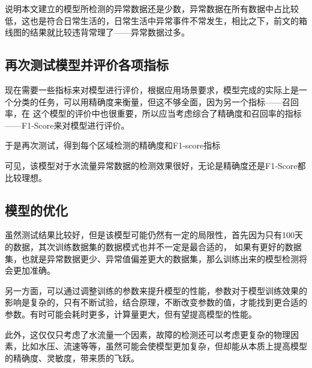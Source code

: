 \documentclass[UTF8]{article}
\begin{document}
			说明本文建立的模型所检测的异常数据还是少数，异常数据在所有数据中占比较低，这也是符合日常生活的，日常生活中异常事件不常发生，相比之下，前文的箱线图的结果就比较违背常理了——异常数据过多。
			\subsection{再次测试模型并评价各项指标}
				\par 现在需要一些指标来对模型进行评价，根据应用场景要求，模型完成的实际上是一个分类的任务，可以用精确度来衡量，但这不够全面，因为另一个指标——召回率，在
				这个模型的评价中也很重要，所以应当考虑综合了精确度和召回率的指标——F1-Score来对模型进行评价。
				\par 于是再次测试，得到每个区域检测的精确度和F1-score指标
				\begin{table}[!ht]
					\centering
				\end{table}
			可见，该模型对于水流量异常数据的检测效果很好，无论是精确度还是F1-Score都比较理想。
				\subsection{模型的优化}
				\par 虽然测试结果比较好，但是该模型可能仍然有一定的局限性，首先因为只有100天的数据，其次训练数据集的数据模式也并不一定是最合适的，
				如果有更好的数据集，也就是异常数据更少、异常值偏差更大的数据集，那么训练出来的模型检测将会更加准确。
				\par 另一方面，可以通过调整训练的参数来提升模型的性能，参数对于模型训练效果的影响是复杂的，只有不断试验，结合原理，不断改变参数的值，才能找到更合适的参数。有时可能会耗时更多，计算量更大，但有望提高模型的性能。
				\par 此外，这仅仅只考虑了水流量一个因素，故障的检测还可以考虑更复杂的物理因素，比如水压、流速等等，虽然可能会使模型更加复杂，但却能从本质上提高模型的精确度、灵敏度，带来质的飞跃。
	\newpage
	
	
	\newpage
\end{document}

